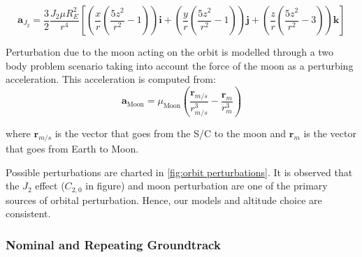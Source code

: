 \begin{equation}
	\mathbf{a}_{J_2} = \frac{3}{2} \frac{J_2 \mu R_E^2}{r^4} \left[ \left( \frac{x}{r} \left( \frac{5z^2}{r^2} - 1 \right) \right) \mathbf{i} + \left( \frac{y}{r} \left( \frac{5z^2}{r^2} - 1 \right) \right) \mathbf{j} + \left( \frac{z}{r} \left( \frac{5z^2}{r^2} - 3 \right) \right) \mathbf{k} \right]
\end{equation}

Perturbation due to the moon acting on the orbit is modelled through a two body problem scenario taking into account the force of the moon as a perturbing acceleration. This acceleration is computed from:
\begin{equation}
	\label{eq:moon_perturbation}
	\mathbf{a}_{\text{Moon}} = \mu_{\text{Moon}}
	\left( \frac{\mathbf{r}_{m/s}}{r_{m/s}^3} - \frac{\mathbf{r}_m}{r_m^3} \right)
\end{equation}

where \( \mathbf{r}_{m/s} \) is the vector that goes from the S/C to the moon and \( \mathbf{r}_m \) is the vector that goes from Earth to Moon.

Possible perturbations are charted in \autoref{fig:orbit perturbations}. It is observed that the \( J_2 \) effect (\( C_{2,0} \) in figure) and moon perturbation are one of the primary sources of orbital perturbation. Hence, our models and altitude choice are consistent.   



\subsubsection{Nominal and Repeating Groundtrack}

